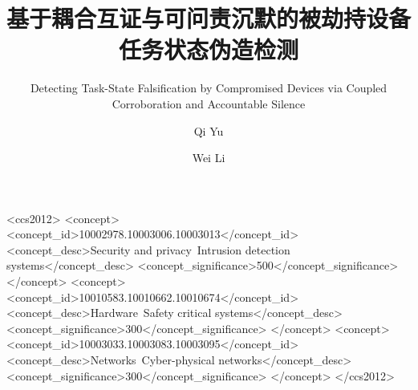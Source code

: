 \documentclass[manuscript,screen,review]{acmart}
\begin{document}
\author{Qi Yu}


\author{Wei Li}




\title{基于耦合互证与可问责沉默的被劫持设备任务状态伪造检测}
\subtitle{Detecting Task-State Falsification by Compromised Devices via Coupled Corroboration and Accountable Silence}

\renewcommand{\shortauthors}{Yu and Li}

\begin{CCSXML}
<ccs2012>
 <concept>
  <concept_id>10002978.10003006.10003013</concept_id>
  <concept_desc>Security and privacy~Intrusion detection systems</concept_desc>
  <concept_significance>500</concept_significance>
 </concept>
 <concept>
  <concept_id>10010583.10010662.10010674</concept_id>
  <concept_desc>Hardware~Safety critical systems</concept_desc>
  <concept_significance>300</concept_significance>
 </concept>
 <concept>
  <concept_id>10003033.10003083.10003095</concept_id>
  <concept_desc>Networks~Cyber-physical networks</concept_desc>
  <concept_significance>300</concept_significance>
 </concept>
</ccs2012>
\end{CCSXML}

\end{document}
